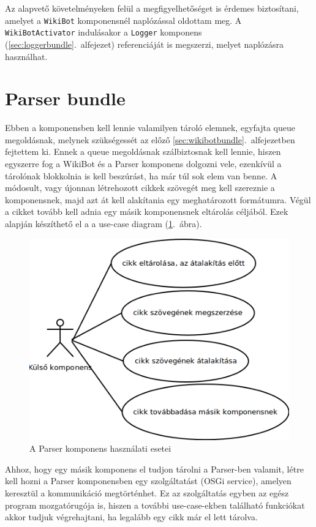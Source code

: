 Az alapvető követelményeken felül a megfigyelhetőséget is érdemes biztosítani, amelyet a \texttt{WikiBot} komponensnél naplózással oldottam meg. A \texttt{WikiBotActivator} indulásakor a \texttt{Logger} komponens (\ref{sec:loggerbundle}.~alfejezet) referenciáját is megszerzi, melyet naplózásra használhat.


\section{Parser bundle}
\label{sec:parserbundle}

Ebben a komponensben kell lennie valamilyen tároló elemnek, egyfajta queue megoldásnak, melynek szükségessét az előző \ref{sec:wikibotbundle}.~alfejezetben fejtettem ki. Ennek a queue megoldásnak szálbiztosnak kell lennie, hiszen egyszerre fog a WikiBot és a Parser komponens dolgozni vele, ezenkívül a tárolónak blokkolnia is kell beszúrást, ha már túl sok elem van benne. A módosult, vagy újonnan létrehozott cikkek szövegét meg kell szereznie a komponensnek, majd azt át kell alakítania egy meghatározott formátumra. Végül a cikket tovább kell adnia egy másik komponensnek eltárolás céljából. Ezek alapján készíthető el a a use-case diagram (\ref{fig:usecase_parser}.~ábra).

\begin{figure}[htp]
\centering
\includegraphics[scale=0.6]{img/usecase_parser}
\caption{A Parser komponens használati esetei}
\label{fig:usecase_parser}
\end{figure}

Ahhoz, hogy egy másik komponens el tudjon tárolni a Parser-ben valamit, létre kell hozni a Parser komponensben egy szolgáltatást (OSGi service), amelyen keresztül a kommunikáció megtörténhet. Ez az szolgáltatás egyben az egész program mozgatórugója is, hiszen a további use-case-ekben található funkciókat akkor tudjuk végrehajtani, ha legalább egy cikk már el lett tárolva.

